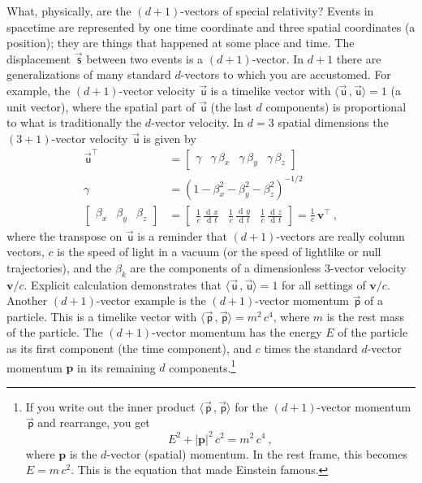 \documentclass{article}
\DeclareMathOperator{\dd}{d\!}
\newcommand\upvec[1]{\!\vec{\,\mathrm{#1}}}
\newcommand{\Evec}[1]{{\mathbf{#1}}} %
\newcommand{\Lvec}[1]{\upvec{\mathsf{#1}}} %
\newcommand{\inner}[2]{\langle{#1}\,,{#2}\rangle}
\newcommand{\plus}{\!+\!} %
\begin{document}
What, physically, are the $(d\plus1)$-vectors of special relativity?
Events in spacetime are represented by one time coordinate and three spatial coordinates (a position); they are things that happened at some place and time.
The displacement $\Lvec{s}$ between two events is a $(d\plus1)$-vector.
In $d\plus1$ there are generalizations of many standard $d$-vectors to which you are accustomed.
For example,
the $(d\plus1)$-vector velocity $\Lvec{u}$ is a timelike vector with $\inner{\Lvec{u}}{\Lvec{u}}=1$ (a unit vector), where the spatial part of $\Lvec{u}$ (the last $d$ components) is proportional to what is traditionally the $d$-vector velocity.
In $d=3$ spatial dimensions the $(3\plus1)$-vector velocity $\Lvec{u}$ is given by
\begin{align}
    \Lvec{u}^\top &= \begin{bmatrix} \gamma & \gamma\,\beta_x & \gamma\,\beta_y & \gamma\,\beta_z \end{bmatrix} \\
    \gamma &= (1 - \beta_x^2 - \beta_y^2 - \beta_z^2)^{-1/2} \nonumber\\
    \begin{bmatrix} \beta_x & \beta_y & \beta_z\end{bmatrix} &= \begin{bmatrix}\displaystyle\frac{1}{c}\,\frac{\dd x}{\dd t} & \displaystyle\frac{1}{c}\,\frac{\dd y}{\dd t} & \displaystyle\frac{1}{c}\,\frac{\dd z}{\dd t} \end{bmatrix} = \frac{1}{c}\,\Evec{v}^\top ~,\nonumber
\end{align}
where the transpose on $\Lvec{u}$ is a reminder that $(d\plus1)$-vectors are really column vectors,
$c$ is the speed of light in a vacuum (or the speed of lightlike or null trajectories),
and the $\beta_k$ are the components of a dimensionless 3-vector velocity $\Evec{v}/c$.
Explicit calculation demonstrates that $\inner{\Lvec{u}}{\Lvec{u}}=1$ for all settings of $\Evec{v}/c$.
Another $(d\plus1)$-vector example is the $(d\plus1)$-vector momentum $\Lvec{p}$ of a particle.
This is a timelike vector with $\inner{\Lvec{p}}{\Lvec{p}}=m^2\,c^4$, where $m$ is the rest mass of the particle.
The $(d\plus1)$-vector momentum has the energy $E$ of the particle as its first component (the time component), and $c$ times the standard $d$-vector momentum $\Evec{p}$ in its remaining $d$ components.\footnote{%
If you write out the inner product $\inner{\Lvec{p}}{\Lvec{p}}$ for the $(d\plus1)$-vector momentum $\Lvec{p}$ and rearrange, you get $$E^2 + |\Evec{p}|^2\,c^2 = m^2\,c^4~,$$ where $\Evec{p}$ is the $d$-vector (spatial) momentum. In the rest frame, this becomes $E=m\,c^2$. This is the equation that made Einstein famous.}
\end{document}
